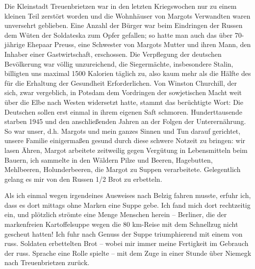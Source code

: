 \documentclass[a5paper,pagesize,10pt,twoside=true]{scrbook}
\renewcommand{\marginpar}[2][]{}
\begin{document}
\marginpar{104} Die Kleinstadt Treuenbrietzen war in den letzten Kriegswochen nur zu einem kleinen Teil zerstört worden und die Wohnhäuser von Margots Verwandten waren unversehrt geblieben. Eine Anzahl der Bürger war beim Eindringen der Russen dem Wüten der Soldateska zum Opfer gefallen; so hatte man auch das über 70-jährige Ehepaar Preuss, eine Schwester von Margots Mutter und ihren Mann, den Inhaber einer Gastwirtschaft, erschossen. Die Verpflegung der deutschen Bevölkerung war völlig unzureichend, die Siegermächte, insbesondere Stalin, billigten uns maximal 1500 Kalorien täglich zu, also kaum mehr als die Hälfte des für die Erhaltung der Gesundheit Erforderlichen. Von Winston Churchill, der sich, zwar vergeblich, in Potsdam dem Vordringen der sowjetischen Macht weit über die Elbe nach Westen widersetzt hatte, stammt das berüchtigte Wort: Die Deutschen sollen erst einmal in ihrem eigenen Saft schmoren. Hunderttausende starben 1945 und den anschließenden Jahren an der Folgen der Unterernährung. So war unser, d.h. Margots und mein ganzes Sinnen und Tun darauf gerichtet, unsere Familie einigermaßen gesund durch diese schwere Notzeit zu bringen: wir lasen Ähren, Margot arbeitete zeitweilig gegen Vergütung in Lebensmitteln beim Bauern, ich sammelte in den Wäldern Pilze und Beeren, Hagebutten, Mehlbeeren, Holunderbeeren, die Margot zu Suppen verarbeitete. Gelegentlich gelang es \marginpar{105} mir von den Russen 1/2 Brot zu erbetteln.

Als ich einmal wegen irgendeines Ausweises nach Belzig fahren musste, erfuhr ich, dass es dort mittags ohne Marken eine Suppe gebe. Ich fand mich dort rechtzeitig ein, und plötzlich strömte eine Menge Menschen herein -- Berliner, die der markenfreien Kartoffelsuppe wegen die 80 km-Reise mit dem Schnellzug nicht gescheut hatten! Ich fuhr nach Genuss der Suppe triumphierend mit einem von russ. Soldaten erbettelten Brot -- wobei mir immer meine Fertigkeit im Gebrauch der russ. Sprache eine Rolle spielte -- mit dem Zuge in einer Stunde über Niemegk nach Treuenbrietzen zurück.
\end{document}

